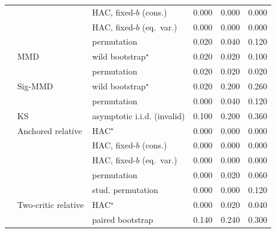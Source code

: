 \begin{tabular}{lllrrr}
 &  & HAC, fixed-$b$ (cons.) & 0.000 & 0.000 & 0.000 \\
 &  & HAC, fixed-$b$ (eq.\ var.) & 0.000 & 0.000 & 0.000 \\
 &  & permutation & 0.020 & 0.040 & 0.120 \\
 & MMD & wild bootstrap$^{\star}$ & 0.020 & 0.020 & 0.100 \\
 &  & permutation & 0.020 & 0.020 & 0.020 \\
 & Sig-MMD & wild bootstrap$^{\star}$ & 0.020 & 0.200 & 0.260 \\
 &  & permutation & 0.000 & 0.040 & 0.120 \\
 & KS & asymptotic i.i.d. (invalid) & 0.100 & 0.200 & 0.360 \\
 & Anchored relative & HAC$^{\star}$ & 0.000 & 0.000 & 0.000 \\
 &  & HAC, fixed-$b$ (cons.) & 0.000 & 0.000 & 0.000 \\
 &  & HAC, fixed-$b$ (eq.\ var.) & 0.000 & 0.000 & 0.000 \\
 &  & permutation & 0.000 & 0.020 & 0.060 \\
 &  & stud. permutation & 0.000 & 0.000 & 0.120 \\
 & Two-critic relative & HAC$^{\star}$ & 0.000 & 0.020 & 0.040 \\
 &  & paired bootstrap & 0.140 & 0.240 & 0.300 \\
\bottomrule
\end{tabular}

